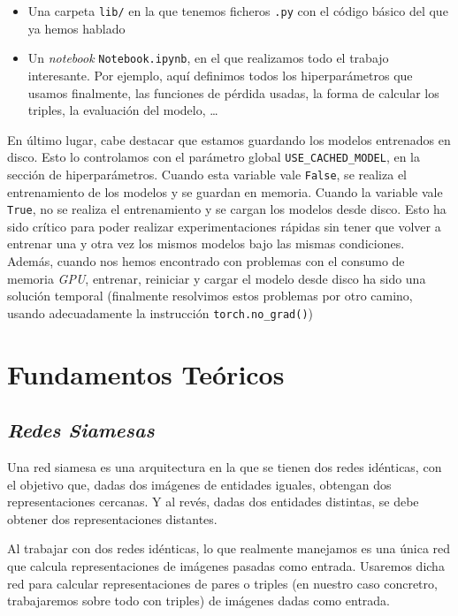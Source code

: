 \documentclass[11pt]{article}
\begin{document}
\begin{itemize}
  \item Una carpeta \lstinline{lib/} en la que tenemos ficheros \lstinline{.py} con el código básico del que ya hemos hablado
  \item Un \emph{notebook} \lstinline{Notebook.ipynb}, en el que realizamos todo el trabajo interesante. Por ejemplo, aquí definimos todos los hiperparámetros que usamos finalmente, las funciones de pérdida usadas, la forma de calcular los triples, la evaluación del modelo, \ldots
\end{itemize}

En último lugar, cabe destacar que estamos guardando los modelos entrenados en disco. Esto lo controlamos con el parámetro global \lstinline{USE_CACHED_MODEL}, en la sección de hiperparámetros. Cuando esta variable vale \lstinline{False}, se realiza el entrenamiento de los modelos y se guardan en memoria. Cuando la variable vale \lstinline{True}, no se realiza el entrenamiento y se cargan los modelos desde disco. Esto ha sido crítico para poder realizar experimentaciones rápidas sin tener que volver a entrenar una y otra vez los mismos modelos bajo las mismas condiciones. Además, cuando nos hemos encontrado con problemas con el consumo de memoria \emph{GPU}, entrenar, reiniciar y cargar el modelo desde disco ha sido una solución temporal (finalmente resolvimos estos problemas por otro camino, usando adecuadamente la instrucción \lstinline{torch.no_grad()})

\pagebreak

\section{Fundamentos Teóricos} 

\subsection {\emph{Redes Siamesas}}

Una red siamesa es una arquitectura en la que se tienen dos redes idénticas, con el objetivo que, dadas dos imágenes de entidades iguales, obtengan dos representaciones cercanas. Y al revés, dadas dos entidades distintas, se debe obtener dos representaciones distantes.

Al trabajar con dos redes idénticas, lo que realmente manejamos es una única red que calcula representaciones de imágenes pasadas como entrada. Usaremos dicha red para calcular representaciones de pares o triples (en nuestro caso concretro, trabajaremos sobre todo con triples) de imágenes dadas como entrada.
\end{document}
